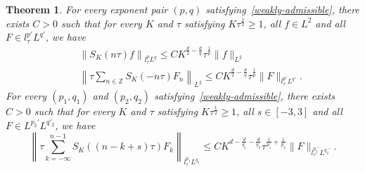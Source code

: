 \documentclass[10pt,a4paper]{article}
\newtheorem{theorem}{Theorem}[section]
\newtheorem{corollary}[theorem]{Corollary}
\begin{document}
  \begin{theorem}\label{thmDSE} %
    For every exponent pair \((p,q)\) satisfying~\eqref{weakly-admissible}, there exists \(C>0\) such that
    for every \(K\) and \(\tau\) satisfying \(K\tau^\frac12 \geq 1\), all \(
    f \in L^2 \) and all \(F \in l^{p'}_\tau L^{q'}\), we have 
    \begin{eqnarray}
      \label{T} & & \left\| S_{K}(n \tau) f\right\|_{l^p_\tau L^q} \leq C K^{\frac{d}2-\frac{d}q} \tau^\frac1p \|f\|_{L^2} \\
      \label{T*} & & \left\| \tau\sum_{n \in \mathbb{Z}}  S_K (-n\tau) F_n \right\|_{L^2} 
      \leq C K^{\frac{d}2-\frac{d}q} \tau^\frac1p \|F\|_{l^{p'}_\tau L^{q'}}.
    \end{eqnarray}
    For every \((p_1, q_1)\) and \((p_2, q_2)\) satisfying~\eqref{weakly-admissible},
    there exists \(C > 0\) such that for every \(K\) and \(\tau\) 
    satisfying \(K\tau^\frac12 \geq 1\), all \( s \in [-3,3] \) and all 
    \(F \in L^{p_2'} L^{q'_2}\), we have
    \begin{equation}\label{TT*}
      \left\| \tau \sum_{k = -\infty}^{n-1}  S_K ((n-k+s)\tau) F_k \right\|_{l^{p_1}_\tau L^{q_1}}
      \leq C K^{d-\frac{d}{q_1}-\frac{d}{q_2}}\tau^{\frac1{p_1}+\frac1{p_2}} \|F\|_{l^{p_2'}_\tau L^{q_2'}}.
    \end{equation}
  \end{theorem}

\end{document}

